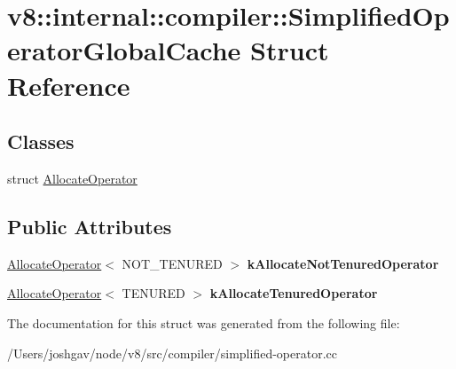\hypertarget{structv8_1_1internal_1_1compiler_1_1_simplified_operator_global_cache}{}\section{v8\+:\+:internal\+:\+:compiler\+:\+:Simplified\+Operator\+Global\+Cache Struct Reference}
\label{structv8_1_1internal_1_1compiler_1_1_simplified_operator_global_cache}
\subsection*{Classes}
\begin{DoxyCompactItemize}
\item 
struct \hyperlink{structv8_1_1internal_1_1compiler_1_1_simplified_operator_global_cache_1_1_allocate_operator}{Allocate\+Operator}
\end{DoxyCompactItemize}
\subsection*{Public Attributes}
\begin{DoxyCompactItemize}
\item 
\hyperlink{structv8_1_1internal_1_1compiler_1_1_simplified_operator_global_cache_1_1_allocate_operator}{Allocate\+Operator}$<$ N\+O\+T\+\_\+\+T\+E\+N\+U\+R\+ED $>$ {\bfseries k\+Allocate\+Not\+Tenured\+Operator}\hypertarget{structv8_1_1internal_1_1compiler_1_1_simplified_operator_global_cache_a6d72fd9c1d8de29f79c6e19f8399da30}{}\label{structv8_1_1internal_1_1compiler_1_1_simplified_operator_global_cache_a6d72fd9c1d8de29f79c6e19f8399da30}

\item 
\hyperlink{structv8_1_1internal_1_1compiler_1_1_simplified_operator_global_cache_1_1_allocate_operator}{Allocate\+Operator}$<$ T\+E\+N\+U\+R\+ED $>$ {\bfseries k\+Allocate\+Tenured\+Operator}\hypertarget{structv8_1_1internal_1_1compiler_1_1_simplified_operator_global_cache_af47e0c4dedcc625cc830552a58c886de}{}\label{structv8_1_1internal_1_1compiler_1_1_simplified_operator_global_cache_af47e0c4dedcc625cc830552a58c886de}

\end{DoxyCompactItemize}


The documentation for this struct was generated from the following file\+:\begin{DoxyCompactItemize}
\item 
/\+Users/joshgav/node/v8/src/compiler/simplified-\/operator.\+cc\end{DoxyCompactItemize}
